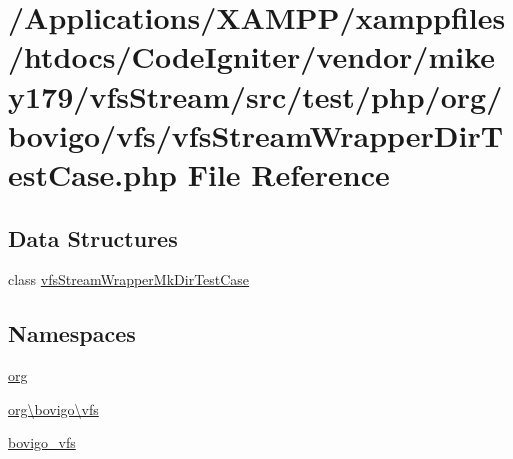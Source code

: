 \hypertarget{vfs_stream_wrapper_dir_test_case_8php}{}\section{/\+Applications/\+X\+A\+M\+P\+P/xamppfiles/htdocs/\+Code\+Igniter/vendor/mikey179/vfs\+Stream/src/test/php/org/bovigo/vfs/vfs\+Stream\+Wrapper\+Dir\+Test\+Case.php File Reference}
\label{vfs_stream_wrapper_dir_test_case_8php}
\subsection*{Data Structures}
\begin{DoxyCompactItemize}
\item 
class \mbox{\hyperlink{classorg_1_1bovigo_1_1vfs_1_1vfs_stream_wrapper_mk_dir_test_case}{vfs\+Stream\+Wrapper\+Mk\+Dir\+Test\+Case}}
\end{DoxyCompactItemize}
\subsection*{Namespaces}
\begin{DoxyCompactItemize}
\item 
 \mbox{\hyperlink{namespaceorg}{org}}
\item 
 \mbox{\hyperlink{namespaceorg_1_1bovigo_1_1vfs}{org\textbackslash{}bovigo\textbackslash{}vfs}}
\item 
 \mbox{\hyperlink{namespacebovigo__vfs}{bovigo\+\_\+vfs}}
\end{DoxyCompactItemize}
